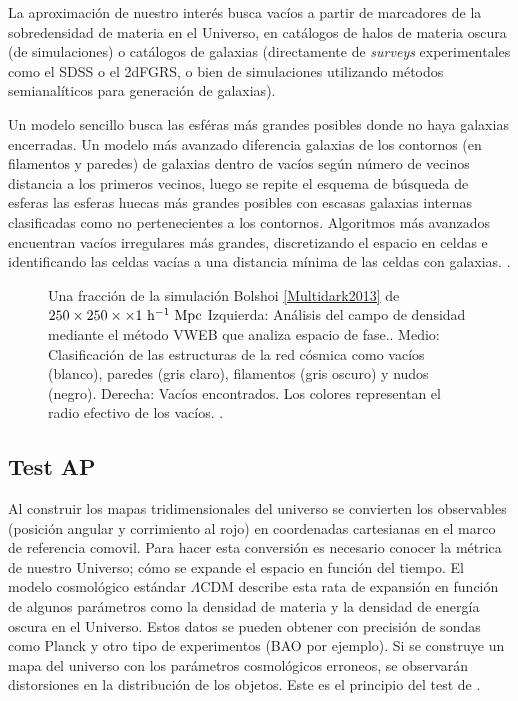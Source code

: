 \documentclass[preprint]{aastex62}
\begin{document}
  La aproximación de nuestro interés busca vacíos a partir de marcadores de la sobredensidad de materia
  en el Universo, en catálogos de halos de materia oscura (de simulaciones) o
  catálogos de galaxias (directamente de \textit{surveys} experimentales como el SDSS o el 2dFGRS, o bien
  de simulaciones utilizando métodos semianalíticos para generación de galaxias).

  Un modelo sencillo busca las esféras más grandes posibles  donde no haya galaxias encerradas.
  Un modelo más avanzado diferencia galaxias de los contornos (en filamentos y paredes)
  de galaxias dentro de vacíos según número de vecinos distancia a los primeros vecinos, luego se repite
  el esquema de búsqueda de esferas las esferas huecas más grandes posibles con escasas galaxias
  internas clasificadas como no pertenecientes a los contornos. Algoritmos más avanzados
  encuentran vacíos irregulares más grandes, discretizando el espacio en celdas e identificando las celdas
  vacías a una distancia mínima de las celdas con galaxias. \citep{Aspen-Amsterdam2008}.


  \begin{figure}
    \caption{Una fracción de la simulación Bolshoi \ref{Multidark2013} de $250 \times 250 \times \times 1 \rm ~h^{-1}~Mpc$
      Izquierda: Análisis del campo de densidad mediante el método VWEB que analiza espacio de fase..
      Medio: Clasificación de las estructuras de la red cósmica como vacíos (blanco),
      paredes (gris claro), filamentos (gris oscuro) y nudos (negro).
      Derecha: Vacíos encontrados. Los colores representan el radio efectivo de los vacíos.
      \citet{https://arxiv.org/pdf/1009.}. \label{fig:voids_in_simulations}}
  \end{figure}
  
  \subsection{Test AP}

  Al construir los mapas tridimensionales del universo se convierten los observables (posición
  angular y corrimiento al rojo) en coordenadas cartesianas en el marco de referencia comovil.
  Para hacer esta conversión es necesario conocer la métrica de nuestro Universo; cómo se
  expande el espacio en función del tiempo. El modelo cosmológico estándar $\Lambda$CDM
  describe esta rata de expansión en función de algunos parámetros como la densidad de materia
  y la densidad de energía oscura en el Universo. Estos datos se pueden obtener con precisión
  de sondas como Planck y otro tipo de experimentos (BAO por ejemplo). Si se construye un mapa
  del universo con los parámetros cosmológicos erroneos, se observarán
  distorsiones en la distribución de los objetos. Este es el principio del test de
  \citet{AlcockPaczynski1979}.
\end{document}
